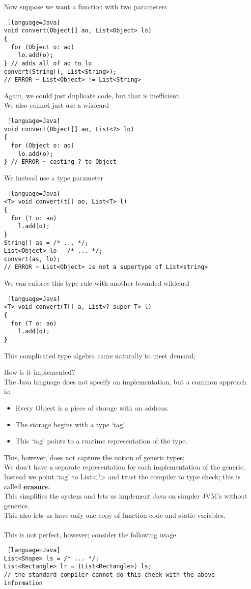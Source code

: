 \documentclass[../../lecture_notes.tex]{subfiles}
\begin{document}
\noindent Now suppose we want a function with two parameters
\begin{lstlisting} [language=Java]
void convert(Object[] ao, List<Object> lo)
{
  for (Object o: ao)
    lo.add(o);
} // adds all of ao to lo
convert(String[], List<String>); 
// ERROR ~ List<Object> != List<String>
\end{lstlisting} \medskip

\noindent Again, we could just duplicate code, but that is inefficient.\\
We also cannot just use a wildcard
\begin{lstlisting} [language=Java]
void convert(Object[] ao, List<?> lo)
{
  for (Object o: ao)
    lo.add(o);
} // ERROR ~ casting ? to Object
\end{lstlisting} \medskip

\noindent We instead use a type parameter
\begin{lstlisting} [language=Java]
<T> void convert(t[] ao, List<T> l)
{
  for (T o: ao)
    l.add(o);
}
String[] as = /* ... */;
List<Object> lo - /* ... */;
convert(as, lo);
// ERROR ~ List<Object> is not a supertype of List<string>
\end{lstlisting} \medskip

\noindent We can enforce this type rule with another bounded wildcard
\begin{lstlisting} [language=Java]
<T> void convert(T[] a, List<? super T> l)
{
  for (T o: ao)
    l.add(o);
}
\end{lstlisting} \medskip
\noindent This complicated type algebra came naturally to meet demand;

How is it implemented?\\
The Java language does not specify an implementation, but a common approach is:
\begin{itemize} [itemsep=0mm]
	\item Every Object is a piece of storage with an address.
	\item The storage begins with a type ‘tag’.
	\item This ‘tag’ points to a runtime representation of the type.
\end{itemize}
This, however, does not capture the notion of generic types;\\
	\indent We don’t have a separate representation for each implementation of the generic.\\
	\indent Instead we point ‘tag’ to List<?> and trust the compiler to type check; 
		this is called \textbf{\underline{erasure}}.\\
This simplifies the system and lets us implement Java on simpler JVM’s without generics.\\
This also lets us have only one copy of function code and static variables.\\
\\
This is not perfect, however; consider the following usage
\begin{lstlisting} [language=Java]
List<Shape> ls = /* ... */;
List<Rectangle> lr = (List<Rectangle>) ls;
// the standard compiler cannot do this check with the above information
\end{lstlisting} \medskip
\end{document}

